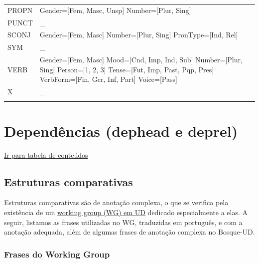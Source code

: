 \documentclass[output=paper,colorlinks,citecolor=brown]{langscibook}
\begin{document}
\begin{longtable}{ p{1.5cm} | p{10cm} }
PROPN & Gender=[Fem, Masc, Unsp] \newline Number=[Plur, Sing] \newline \\
PUNCT & \_ \newline\\
SCONJ & Gender=[Fem, Masc] \newline Number=[Plur, Sing] \newline PronType=[Ind, Rel] \newline \\
SYM & \_ \newline\\
VERB & Gender=[Fem, Masc] \newline Mood=[Cnd, Imp, Ind, Sub] \newline Number=[Plur, Sing] \newline Person=[1, 2, 3] \newline Tense=[Fut, Imp, Past, Pqp, Pres] \newline VerbForm=[Fin, Ger, Inf, Part] \newline Voice=[Pass] \newline \\
X & \_ \\

\label{tab:feats}
\end{longtable}

\chapter{Dependências (dephead e deprel)}

\hyperlink{toc}{Ir para tabela de conteúdos\\}



\section{Estruturas comparativas}



Estruturas comparativas são de anotação complexa, o que se verifica pela existência de um \href{https://universaldependencies.org/workgroups/comparatives.html}{working group (WG) em UD} dedicado especialmente a elas. A seguir, listamos as frases utilizadas no WG, traduzidas em português, e com a anotação adequada, além de algumas frases de anotação complexa no Bosque-UD.

\subsection{Frases do Working Group}
\end{document}
